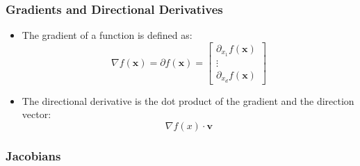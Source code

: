 \documentclass{article}
\newcommand{\mbf}[1]{\mathbf{#1}}
\begin{document}
\subsubsection{Gradients and Directional Derivatives}

\begin{itemize}
    \item The gradient of a function is defined as:
    \[
    \nabla f(\mathbf{x}) = \partial f(\mathbf{x}) =
    \begin{bmatrix}
    \partial_{x_1} f(\mathbf{x}) \\
    \vdots \\
    \partial_{x_d} f(\mathbf{x})
    \end{bmatrix}
    \]
    \item The directional derivative is the dot product of the gradient and the direction vector:
    \[\nabla f(x) \cdot \mbf{v}\]
\end{itemize}

\subsubsection{Jacobians}
\end{document}
